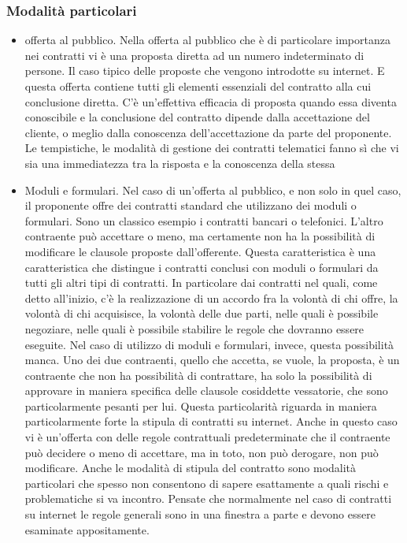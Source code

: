 \subsubsection{Modalità particolari}
\begin{itemize}
    \item offerta al pubblico. Nella offerta al pubblico che è di particolare importanza nei contratti vi è una proposta diretta ad un numero indeterminato di persone. Il caso tipico delle proposte che vengono introdotte su internet. E questa offerta contiene tutti gli elementi essenziali del contratto alla cui conclusione diretta. C'è un'effettiva efficacia di proposta quando essa diventa conoscibile e la conclusione del contratto dipende dalla accettazione del cliente, o meglio dalla conoscenza dell'accettazione da parte del proponente. Le tempistiche, le modalità di gestione dei contratti telematici fanno sì che vi sia una immediatezza tra la risposta e la conoscenza della stessa
    \item Moduli e formulari. Nel caso di un'offerta al pubblico, e non solo in quel caso, il proponente offre dei contratti standard che utilizzano dei moduli o formulari. Sono un classico esempio i contratti bancari o telefonici. L'altro contraente può accettare o meno, ma certamente non ha la possibilità di modificare le clausole proposte dall'offerente. Questa caratteristica è una caratteristica che distingue i contratti conclusi con moduli o formulari da tutti gli altri tipi di contratti. In particolare dai contratti nel quali, come detto all'inizio, c'è la realizzazione di un accordo fra la volontà di chi offre, la volontà di chi acquisisce, la volontà delle due parti, nelle quali è possibile negoziare, nelle quali è possibile stabilire le regole che dovranno essere eseguite. Nel caso di utilizzo di moduli e formulari, invece, questa possibilità manca. Uno dei due contraenti, quello che accetta, se vuole, la proposta, è un contraente che non ha possibilità di contrattare, ha solo la possibilità di approvare in maniera specifica delle clausole cosiddette vessatorie, che sono particolarmente pesanti per lui. Questa particolarità riguarda in maniera particolarmente forte la stipula di contratti su internet. Anche in questo caso vi è un'offerta con delle regole contrattuali predeterminate che il contraente può decidere o meno di accettare, ma in toto, non può derogare, non può modificare. Anche le modalità di stipula del contratto sono modalità particolari che spesso non consentono di sapere esattamente a quali rischi e problematiche si va incontro. Pensate che normalmente nel caso di contratti su internet le regole generali sono in una finestra a parte e devono essere esaminate appositamente.
\end{itemize} 

